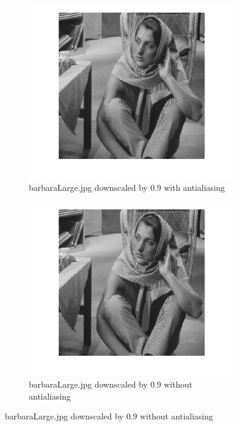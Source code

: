 \documentclass{article}
\begin{document}
\begin{figure}
    \centering
    \begin{subfigure}[b]{0.4\linewidth}
        \centering
        \includegraphics[width=\linewidth]{barb09aa.png}
        \caption{barbaraLarge.jpg downscaled by 0.9 with antialiasing}
    \end{subfigure}
    \begin{subfigure}[b]{0.4\linewidth}
        \centering
        \includegraphics[width=\linewidth]{barb09noaa.png}
        \caption{barbaraLarge.jpg downscaled by 0.9 without antialiasing}

\end{subfigure}
\end{figure}
\end{document}
